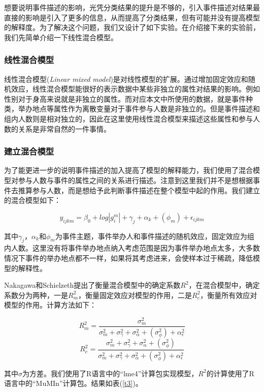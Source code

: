 想要说明事件描述的影响，光凭分类结果的提升是不够的，引入事件描述对结果最直接的影响是引入了更多的信息，从而提高了分类结果，但有可能并没有提高模型的解释度。为了解决这个问题，我们又设计了如下实验。在介绍接下来的实验前，我们先简单介绍一下线性混合模型。

\subsubsection{线性混合模型}

线性混合模型(\textit{Linear mixed model})是对线性模型的扩展。通过增加固定效应和随机效应，线性混合模型能很好的表示数据中某些非独立的属性对结果的影响。例如性别对于身高来说就是非独立的属性。而对应本文中所使用的数据，就是事件种类，举办地点等属性作为离散变量对于事件参与人数是非独立的。但是事件描述和组内人数则是相对独立的，因此在这里使用线性混合模型来描述这些属性和参与人数的关系是非常自然的一件事情。

\subsubsection{建立混合模型}

为了能更进一步的说明事件描述的加入提高了模型的解释能力，我们使用了混合模型对参与人数与事件的属性之间的关系进行描述。注意到这里我们并不是想根据事件去推算参与人数，而是想给予此判断事件描述在整个模型中起的作用。我们建立的混合模型如下：

\[
y_{ijkm}=\beta_0+log|g_i^m|+\gamma_j+\alpha_k+ (\phi_m) +\epsilon_{ijkm}
\]

其中\(\gamma_j\)，\(\alpha_k\)和\(\phi_m\)为事件主题，事件举办人和事件描述的随机效应，固定效应为组内人数。这里没有将事件举办地点纳入考虑范围是因为事件举办地点太多，大多数情况下事件的举办地点都不一样，如果将其考虑进来，会使样本过于稀疏，降低模型的解释性。

Nakagawa和Schielzeth\cite{nakagawa_ageneralandsimplemethodforobtaining_2013}提出了衡量混合模型中的确定系数\(R^2\)，在混合模型中，确定系数分为两种，一是\(R_m^2\)，衡量固定效应对模型的作用，二是\(R_c^2\)，衡量所有效应对模型的作用。计算方法如下：

\[
R_m^2=\frac{\sigma_m^2}{\sigma_m^2+\sigma_\gamma^2+\sigma_\alpha^2+(\sigma_\phi^2)+\alpha_\epsilon^2}
\] \[
R_c^2=\frac{\sigma_m^2+\sigma_\gamma^2+\sigma_\alpha^2+(\sigma_\phi^2)}{\sigma_m^2+\sigma_\gamma^2+\sigma_\alpha^2+(\sigma_\phi^2)+\alpha_\epsilon^2}
\]

其中\(\sigma\)为方差。我们使用了R语言中的``lme4''计算包\cite{lme4}实现模型，\(R^2\)的计算使用了R语言中的``MuMIn''计算包\cite{MuMIn}。结果如表(\ref{t3})。

